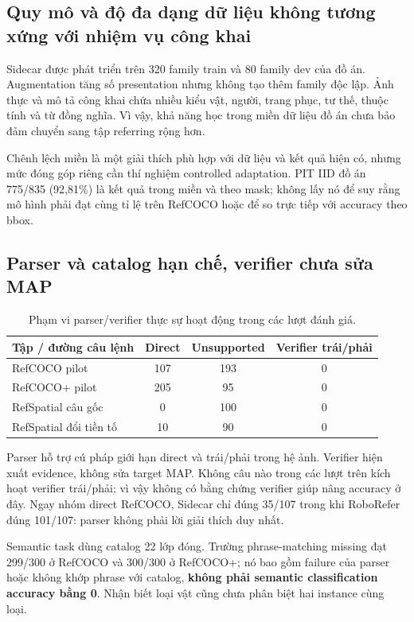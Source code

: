 \documentclass[11pt,a4paper]{article}
\begin{document}
\subsection{Quy mô và độ đa dạng dữ liệu không tương xứng với nhiệm vụ công khai}
Sidecar được phát triển trên 320 family train và 80 family dev của đồ án.
Augmentation tăng số presentation nhưng không tạo thêm family độc lập.
Ảnh thực và mô tả công khai chứa nhiều kiểu vật, người, trang phục, tư thế,
thuộc tính và từ đồng nghĩa. Vì vậy, khả năng học trong miền dữ liệu đồ án
chưa bảo đảm chuyển sang tập referring rộng hơn.

Chênh lệch miền là một giải thích phù hợp với dữ liệu và kết quả hiện có,
nhưng mức đóng góp riêng cần thí nghiệm controlled adaptation.
PIT IID đồ án 775/835 (92,81\%) là kết quả trong miền và theo mask;
không lấy nó để suy rằng mô hình phải đạt cùng tỉ lệ trên RefCOCO hoặc để
so trực tiếp với accuracy theo bbox.

\subsection{Parser và catalog hạn chế, verifier chưa sửa MAP}
\begin{table}[H]\centering\small
\caption{Phạm vi parser/verifier thực sự hoạt động trong các lượt đánh giá.}
\begin{tabularx}{\linewidth}{Y c c c}
\toprule
Tập / đường câu lệnh & Direct & Unsupported & Verifier trái/phải\\
\midrule
RefCOCO pilot & 107 & 193 & 0\\
RefCOCO+ pilot & 205 & 95 & 0\\
RefSpatial câu gốc & 0 & 100 & 0\\
RefSpatial đổi tiền tố & 10 & 90 & 0\\
\bottomrule
\end{tabularx}
\end{table}

Parser hỗ trợ cú pháp giới hạn direct và trái/phải trong hệ ảnh. Verifier
hiện xuất evidence, không sửa target MAP. Không câu nào trong các lượt trên
kích hoạt verifier trái/phải; vì vậy không có bằng chứng verifier giúp nâng
accuracy ở đây. Ngay nhóm direct RefCOCO, Sidecar chỉ đúng 35/107 trong khi
RoboRefer đúng 101/107: parser không phải lời giải thích duy nhất.

\begin{samepage}
Semantic task dùng catalog 22 lớp đóng. Trường phrase-matching missing đạt
299/300 ở RefCOCO và 300/300 ở RefCOCO+; nó bao gồm failure của parser hoặc
không khớp phrase với catalog, \textbf{không phải semantic classification
accuracy bằng 0}. Nhận biết loại vật cũng chưa phân biệt hai instance cùng loại.
\end{samepage}
\end{document}
